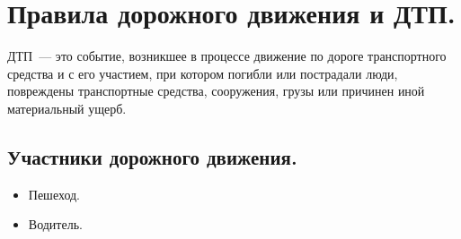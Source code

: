 \documentclass[12pt]{article}
\begin{document}
	\tableofcontents
	\setcounter{tocdepth}{3}
	\newpage
	\section{Правила дорожного движения и ДТП.}
	\begin{definition}
		ДТП~--- это событие, возникшее в процессе движение по дороге транспортного средства и с его участием, при котором погибли или пострадали люди, повреждены транспортные средства, сооружения, грузы или причинен иной материальный ущерб.
	\end{definition}
	\subsection{Участники дорожного движения.}
	\begin{itemize}
		\item Пешеход.
		\item Водитель.
	\end{itemize}
\end{document}
